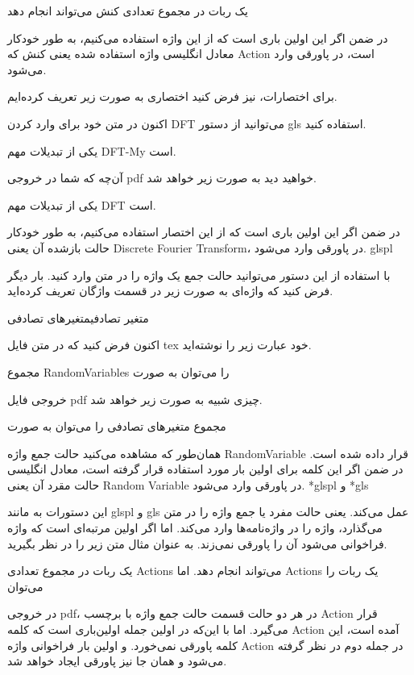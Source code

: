 یک ربات در مجموع تعدادی کنش می‌تواند انجام دهد

در ضمن اگر این اولین باری است که از این واژه استفاده می‌کنیم، به طور خودکار معادل انگلیسی واژه استفاده شده یعنی کنش که Action است، در پاورقی وارد می‌شود.

برای اختصارات، نیز فرض کنید اختصاری به صورت زیر تعریف کرده‌ایم.


اکنون در متن خود برای وارد کردن DFT می‌توانید از دستور gls استفاده کنید.

یکی از تبدیلات مهم ‪\gls{DFT-My}‬ است.

آن‌چه که شما در خروجی pdf‌ خواهید دید به صورت زیر خواهد شد.

یکی از تبدیلات مهم DFT است.

در ضمن اگر این اولین باری است که از این اختصار استفاده می‌کنیم، به طور خودکار حالت بازشده آن یعنی Discrete Fourier Transform، در پاورقی وارد می‌شود.
glspl

با استفاده از این دستور می‌توانید حالت جمع یک واژه را در متن وارد کنید. بار دیگر فرض کنید که واژه‌ای به صورت زیر در قسمت واژگان تعریف کرده‌اید.

{متغیر تصادفی}{متغیرهای تصادفی}

اکنون فرض کنید که در متن فایل tex خود عبارت زیر را نوشته‌اید.

مجموع ‪\glspl{RandomVariable}‬ را می‌توان به صورت

خروجی فایل pdf چیزی شبیه به صورت زیر خواهد شد.

مجموع متغیرهای تصادفی را می‌توان به صورت

همان‌طور که مشاهده می‌کنید حالت جمع واژه RandomVariable قرار داده شده است. در ضمن اگر این کلمه برای اولین بار مورد استفاده قرار گرفته است، معادل انگلیسی حالت مقرد آن یعنی Random Variable در پاورقی وارد می‌شود.
*glspl و *gls

این دستورات به مانند glspl و gls عمل می‌کند. یعنی حالت مفرد یا جمع واژه را در متن می‌گذارد، واژه را در واژه‌نامه‌ها وارد می‌کند. اما اگر اولین مرتبه‌ای است که واژه فراخوانی می‌شود آن را پاورقی نمی‌زند. به عنوان مثال متن زیر را در نظر بگیرید.

یک ربات در مجموع تعدادی ‪\glspl*{Action}‬ می‌تواند انجام دهد. اما ‪\glspl{Action}‬ یک ربات را می‌توان

در خروجی pdf، در هر دو حالت قسمت حالت جمع واژه با برچسب Action قرار می‌گیرد. اما با این‌که در اولین جمله اولین‌باری است که کلمه Action آمده است، این کلمه پاورقی نمی‌خورد. و اولین بار فراخوانی واژه Action در جمله دوم در نظر گرفته می‌شود و همان جا نیز پاورقی ایجاد خواهد شد.

